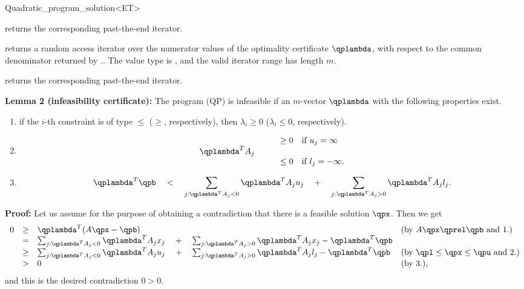 \begin{ccRefClass}{Quadratic_program_solution<ET>}
\begin{ccAdvanced}
{returns the corresponding past-the-end iterator.}

{returns a random access iterator over the numerator values
of the optimality certificate $\qplambda$, with respect to the
common denominator returned by \ccVar.. 
The value type is , and the valid iterator range has length $m$.}

{returns the corresponding past-the-end iterator.}

\ccExample
{}

{\bf Lemma 2 (infeasibility certificate):} The program (QP) is
infeasible if an $m$-vector $\qplambda$ with the
following properties exist.
\begin{enumerate}
\item if the $i$-th constraint is of type $\leq$ ($\geq$, respectively), 
then $\lambda_i\geq 0$ ($\lambda_i\leq 0$, respectively).
\item 
\[
\begin{array}{llll}
&&\geq 0 & \mbox{if $u_j=\infty$} \\
\qplambda^T A_j &\quad  \\
&&\leq 0 & \mbox{if $l_j=-\infty$.}
\end{array}
\]
\item \[\qplambda^T\qpb \quad<\quad \sum_{j: \qplambda^TA_j <0} \qplambda^TA_j u_j 
\quad+\quad  \sum_{j: \qplambda^TA_j >0} \qplambda^TA_j l_j.\]
\end{enumerate}

{\bf Proof:} Let us assume for the purpose of obtaining a contradiction
that there is a feasible solution $\qpx$. Then we get
\[
\begin{array}{lcll}
0 &\geq& \qplambda^T(A\qpx -\qpb) &  \mbox{(by $A\qpx\qprel \qpb$ and 1.)} \\
  &=& \sum_{j: \qplambda^TA_j <0} \qplambda^TA_j x_j 
\quad+\quad  \sum_{j: \qplambda^TA_j >0} \qplambda^TA_j x_j - \qplambda^T \qpb \\
  &\geq& \sum_{j: \qplambda^TA_j <0} \qplambda^TA_j u_j 
\quad+\quad  \sum_{j: \qplambda^TA_j >0} \qplambda^TA_j l_j - \qplambda^T \qpb &
\mbox{(by $\qpl\leq \qpx \leq \qpu$ and 2.)} \\
  &>& 0 & \mbox{(by 3.)}, 
\end{array}
\]
and this is the desired contradiction $0>0$.



\end{ccAdvanced}
\end{ccRefClass}
